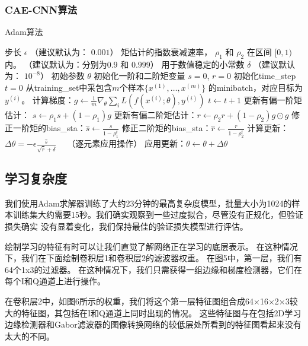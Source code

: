 \subsubsection{CAE-CNN算法}


\begin{algorithm}[ht]
	\caption{Adam算法}
	\label{alg:adam}
	\begin{algorithmic}
		\REQUIRE 步长 $\epsilon$ （建议默认为： $0.001$）
		\REQUIRE 矩估计的指数衰减速率， $\rho_1$ 和 $\rho_2$ 在区间 $[0, 1)$内。
		（建议默认为：分别为$0.9$ 和 $0.999$）
		\REQUIRE 用于数值稳定的小常数 $\delta$  （建议默认为： $10^{-8}$）
		\REQUIRE 初始参数 $\theta$
		\STATE 初始化一阶和二阶矩变量 $s = 0 $, $r = 0$
		\STATE 初始化\gls{time_step} $t=0$ 
		\STATE 从\gls{training_set}中采包含$m$个样本$\{ x^{(1)},\dots, x^{(m)}\}$ 的\gls{minibatch}，对应目标为$y^{(i)}$。
		\STATE 计算梯度：$g \leftarrow \frac{1}{m} \nabla_{\theta} \sum_i L(f(x^{(i)};\theta),y^{(i)})$ 
		\STATE $t \leftarrow t + 1$
		\STATE 更新有偏一阶矩估计： $s \leftarrow \rho_1 s + (1-\rho_1) g$
		\STATE 更新有偏二阶矩估计：$r \leftarrow \rho_2 r + (1-\rho_2)  g \odot g$
		\STATE 修正一阶矩的\gls{bias_sta}：$\hat{s} \leftarrow \frac{s}{1-\rho_1^t}$
		\STATE 修正二阶矩的\gls{bias_sta}：$\hat{r} \leftarrow \frac{r}{1-\rho_2^t}$
		\STATE 计算更新：$\Delta \theta = - \epsilon \frac{\hat{s}}{\sqrt{\hat{r}} + \delta}$ \ \  （逐元素应用操作）
		\STATE 应用更新：$\theta \leftarrow \theta + \Delta \theta$
		\ENDWHILE
	\end{algorithmic}
\end{algorithm}

\subsection{学习复杂度}
我们使用Adam求解器训练了大约23分钟的最高复杂度模型，批量大小为1024的样本训练集大约需要15秒。我们确实观察到一些过度拟合，尽管没有正规化，但验证损失确实 没有显着变化，我们保持最佳的验证损失模型进行评估。\par

绘制学习的特征有时可以让我们直觉了解网络正在学习的底层表示。 在这种情况下，我们在下面绘制卷积层1和卷积层2的滤波器权重。 在图5中，第一层，我们有64个1x3的过滤器。 在这种情况下，我们只需获得一组边缘和梯度检测器，它们在每个I和Q通道上进行操作。\par

在卷积层2中，如图6所示的权重，我们将这个第一层特征图组合成64×16×2×3较大的特征图，其包括在I和Q通道上同时出现的情况。 这些特征图与在包括2D学习边缘检测器和Gabor滤波器的图像转换网络的较低层处所看到的特征图看起来没有太大的不同。\par


